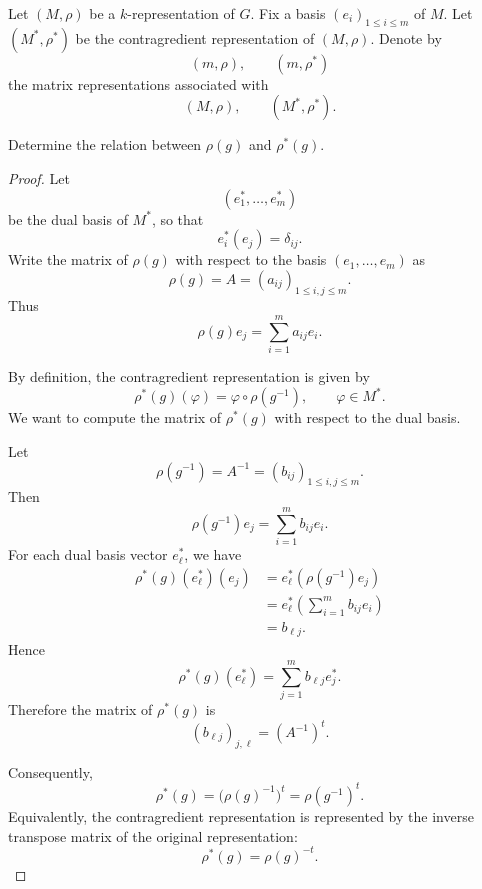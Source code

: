 \begin{exercise}
    Let \((M,\rho)\) be a \(k\)-representation of \(G\). Fix a basis
    \((e_i)_{1\leq i\leq m}\) of \(M\). Let \((M^*,\rho^*)\) be the contragredient
    representation of \((M,\rho)\). Denote by
    \[
        (m,\rho),\qquad (m,\rho^*)
    \]
    the matrix representations associated with
    \[
        (M,\rho),\qquad (M^*,\rho^*).
    \]

    Determine the relation between \(\rho(g)\) and \(\rho^*(g)\).
\end{exercise}

\begin{proof}
    Let
    \[
        (e_1^*,\dots,e_m^*)
    \]
    be the dual basis of \(M^*\), so that
    \[
        e_i^*(e_j)=\delta_{ij}.
    \]
    Write the matrix of \(\rho(g)\) with respect to the basis
    \((e_1,\dots,e_m)\) as
    \[
        \rho(g)=A=(a_{ij})_{1\leq i,j\leq m}.
    \]
    Thus
    \[
        \rho(g)e_j=\sum_{i=1}^m a_{ij}e_i.
    \]

    By definition, the contragredient representation is given by
    \[
        \rho^*(g)(\varphi)=\varphi\circ \rho(g^{-1}),
        \qquad \varphi\in M^*.
    \]
    We want to compute the matrix of \(\rho^*(g)\) with respect to the dual basis.

    Let
    \[
        \rho(g^{-1})=A^{-1}=(b_{ij})_{1\leq i,j\leq m}.
    \]
    Then
    \[
        \rho(g^{-1})e_j=\sum_{i=1}^m b_{ij}e_i.
    \]
    For each dual basis vector \(e_\ell^*\), we have
    \[
    \begin{aligned}
        \rho^*(g)(e_\ell^*)(e_j)
        &= e_\ell^*(\rho(g^{-1})e_j) \\
        &= e_\ell^*\left(\sum_{i=1}^m b_{ij}e_i\right) \\
        &= b_{\ell j}.
    \end{aligned}
    \]
    Hence
    \[
        \rho^*(g)(e_\ell^*)
        =
        \sum_{j=1}^m b_{\ell j}e_j^*.
    \]
    Therefore the matrix of \(\rho^*(g)\) is
    \[
        (b_{\ell j})_{j,\ell}
        =
        (A^{-1})^t.
    \]

    Consequently,
    \[
        \rho^*(g)
        =
        \bigl(\rho(g)^{-1}\bigr)^t
        =
        \rho(g^{-1})^t.
    \]
    Equivalently, the contragredient representation is represented by the inverse
    transpose matrix of the original representation:
    \[
        \boxed{\rho^*(g)=\rho(g)^{-t}.}
    \]
\end{proof}

